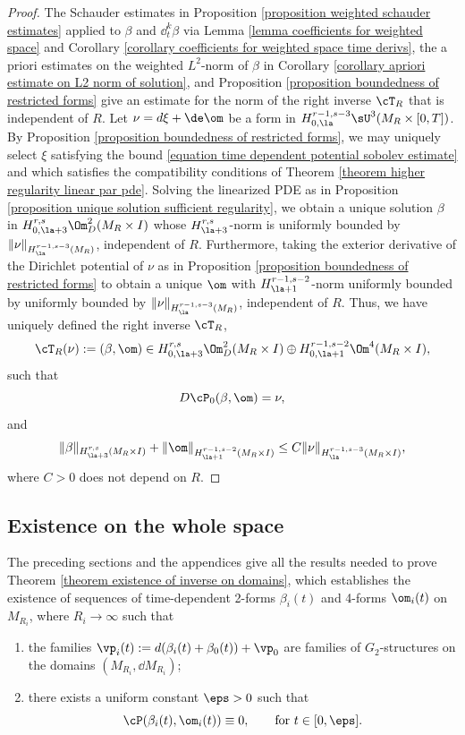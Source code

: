 \documentclass[hidelinks, 12pt, oneside, reqno]{amsart}
\begin{document}
\begin{proof}
    The Schauder estimates in Proposition \ref{proposition weighted schauder estimates} applied to $\beta$ and $\dd_t^k\beta$ via Lemma \ref{lemma coefficients for weighted space} and Corollary \ref{corollary coefficients for weighted space time derivs}, the a priori estimates on the weighted $L^2$-norm of $\beta$ in Corollary \ref{corollary apriori estimate on L2 norm of solution}, and Proposition \ref{proposition boundedness of restricted forms} give an estimate for the norm of the right inverse $\cT_R$ that is independent of $R$. Let $\nu = d\xi + \de \om$ be a form in $H_{0,\la}^{r-1,s-3} \sU^3(M_R \times [0,T])$. By Proposition \ref{proposition boundedness of restricted forms}, we may uniquely select $\xi$ satisfying the bound \eqref{equation time dependent potential sobolev estimate} and which satisfies the compatibility conditions of Theorem \ref{theorem higher regularity linear par pde}.  Solving the linearized PDE as in Proposition \ref{proposition unique solution sufficient regularity}, we obtain a unique solution $\beta$ in $H^{r,s}_{0,\la +3} \Om^2_D (M_R \times I)$ whose $H^{r,s}_{\la + 3}$-norm is uniformly bounded by $\|\nu\|_{H^{r-1,s-3}_\la(M_R)}$, independent of $R$. Furthermore, taking the exterior derivative of the Dirichlet potential of $\nu$ as in Proposition \ref{proposition boundedness of restricted forms} to obtain a unique $\om$ with $H^{r-1,s-2}_{\la + 1}$-norm uniformly bounded by uniformly bounded by $\|\nu\|_{H^{r-1,s-3}_\la(M_R)}$, independent of $R$. Thus, we have uniquely defined the right inverse $\cT_R$,
    \[
    \cT_R(\nu) := (\beta, \om) \in H^{r,s}_{0,\la+3}\Om^2_D(M_R \times I) \oplus H^{r-1,s-2}_{0,\la+1}\Om^4(M_R \times I), 
    \]
    such that 
    \[
    D\cP_0(\beta, \om) = \nu,
    \]
    and
    \[
    \|\beta\|_{H^{r,s}_{\la+3}(M_R \times I)} + \|\om\|_{H^{r-1,s-2}_{\la+1} (M_R \times I)} \le C \|\nu\|_{H^{r-1,s-3}_\la(M_R \times I)},
    \]
    where $C > 0$ does not depend on $R$.
\end{proof}

\subsection{Existence on the whole space}\label{subsection existence everywhere}

The preceding sections and the appendices give all the results needed to prove Theorem \ref{theorem existence of inverse on domains}, which establishes the existence of sequences of time-dependent 2-forms $\beta_i(t)$ and 4-forms $\om_i(t)$ on $M_{R_i}$, where $R_i \rightarrow \infty$ such that 
\begin{enumerate}
    \item[(a)] the families $\vp_i(t) := d(\beta_i(t) +\beta_0(t)) + \vp_0$ are families of $G_2$-structures on the domains $(M_{R_i}, \dd M_{R_i})$;
    \item[(b)] there exists a uniform constant $\eps > 0$ such that 
            \[
                \cP(\beta_i(t),\om_i(t)) \equiv 0, \qquad \text{for } t \in [0, \eps].
            \]
\end{enumerate}
\end{document}
